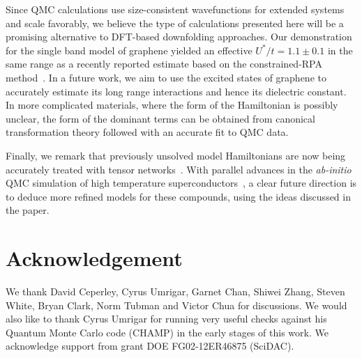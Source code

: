 \documentclass[aip,jcp,twocolumn,10pt]{revtex4-1}
\begin{document}
Since QMC calculations use 
size-consistent wavefunctions for extended systems and 
scale favorably, we believe the type of calculations presented 
here will be a promising alternative to DFT-based downfolding approaches. 
Our demonstration for the single band model of graphene 
yielded an effective $U^{*}/t=1.1\pm0.1$ in the same 
range as a recently reported estimate based 
on the constrained-RPA method~\cite{Schuler_graphene}. In a future work,
we aim to use the excited states of graphene to accurately 
estimate its long range interactions and hence its dielectric constant. 
In more complicated materials, where the form of the Hamiltonian is 
possibly unclear, the form of the dominant terms can be obtained 
from canonical transformation theory followed with an 
accurate fit to QMC data. 

Finally, we remark that previously unsolved model Hamiltonians 
are now being accurately treated with tensor 
networks~\cite{Stoudenmire_White_2D_DMRG, Corboz_Rice_Troyer}. 
With parallel advances in the \emph{ab-initio} QMC simulation of high temperature 
superconductors~\cite{Wagner_cuprates, Krogel_cuprates}, a clear future direction 
is to deduce more refined models for these compounds, using the ideas discussed in the paper. 

\section{Acknowledgement} 
We thank  David Ceperley,  Cyrus Umrigar,  Garnet Chan,  Shiwei Zhang, 
 Steven White,  Bryan Clark, Norm Tubman and Victor Chua 
for discussions. We would also like to thank  Cyrus Umrigar for 
running very useful checks against his Quantum Monte Carlo code (CHAMP) in the early stages of 
this work. We acknowledge support from grant DOE FG02-12ER46875 (SciDAC). 



\end{document}
